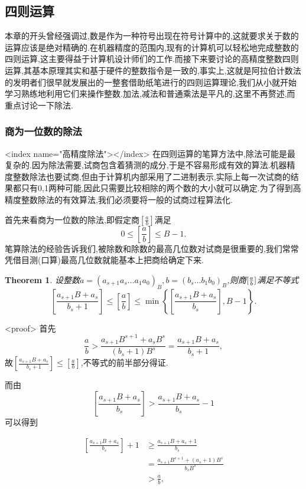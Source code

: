 \documentclass{ctexart}
\newtheorem{theorem}{Theorem}
\theoremstyle{remark}
\theoremstyle{definition}
\begin{document}
\subsection{四则运算}

本章的开头曾经强调过,数是作为一种符号出现在符号计算中的,这就要求关于数的运算应该是绝对精确的.在机器精度的范围内,现有的计算机可以轻松地完成整数的四则运算,这主要得益于计算机设计师们的工作.而接下来要讨论的高精度整数四则运算,其基本原理其实和基于硬件的整数指令是一致的,事实上,这就是阿拉伯计数法的发明者们很早就发展出的一整套借助纸笔进行的四则运算理论,我们从小就开始学习熟练地利用它们来操作整数.加法,减法和普通乘法是平凡的,这里不再赘述,而重点讨论一下除法.

\subsubsection{商为一位数的除法}
<index name="高精度除法"></index>
在四则运算的笔算方法中,除法可能是最复杂的.因为除法需要,试商包含着猜测的成分,于是不容易形成有效的算法.机器精度整数除法也要试商,但由于计算机内部采用了二进制表示,实际上每一次试商的结果都只有0,1两种可能,因此只需要比较相除的两个数的大小就可以确定.为了得到高精度整数除法的有效算法,我们必须要将一般的试商过程算法化.

首先来看商为一位数的除法,即假定商$\left[\frac{a}{b}\right]$满足$$0\le\left[\frac{a}{b}\right]\le B-1.$$笔算除法的经验告诉我们,被除数和除数的最高几位数对试商是很重要的,我们常常凭借目测(口算)最高几位数就能基本上把商给确定下来.

\begin{theorem}\label{th:division1}
设整数$a=(a_{s+1}a_s\ldots a_1a_0)_B,b=(b_s\ldots b_1b_0)_B$,则商$[{a\over b}]$满足不等式
$$\left[\frac{a_{s+1}B+a_s}{b_s+1}\right]\le\left[\frac{a}{b}\right]\le\min\left\{\left[\frac{a_{s+1}B+a_s}{b_s}\right],B-1\right\}.$$
\end{theorem}
<proof>
首先$$\frac{a}{b}>\frac{a_{s+1}B^{s+1}+a_sB^s}{(b_s+1)B^s}=\frac{a_{s+1}B+a_s}{b_s+1},$$故$\left[\frac{a_{s+1}B+a_s}{b_s+1}\right] \le \left[\frac{a}{b}\right]$,不等式的前半部分得证.

而由$$\left[\frac{a_{s+1}B+a_s}{b_s}\right] > \frac{a_{s+1}B+a_s}{b_s}-1$$可以得到

\begin{align*}
  \left[\frac{a_{s+1}B+a_s}{b_s}\right]+1&\ge\frac{a_{s+1}B+a_s+1}{b_s}\\
&=\frac{a_{s+1}B^{s+1}+(a_s+1)B^s}{b_sB^s}\\
&>\frac{a}{b},
\end{align*}
\end{document}
